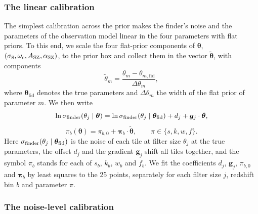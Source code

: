 \subsubsection{The linear calibration}\label{sec:calib-linear}

The simplest calibration across the prior makes the finder's noise and the parameters of the observation
model linear in the four parameters with flat priors. To this end, we scale the four flat-prior
components of $\bm\theta$, $(\sigma_8, \omega_\mathrm{c}, A_\mathrm{SZ}, \alpha_\mathrm{SZ})$, to the prior box and collect them in the vector
$\tilde{\bm{\theta}}$, with components
\begin{equation}
\tilde\theta_m = \frac{\theta_m - \theta_{m,\mathrm{fid}}}{\Delta\theta_m},
\label{eq:calib-x}
\end{equation}
where $\bm{\theta}_\mathrm{fid}$ denotes the true parameters and $\Delta\theta_m$ the width of the flat prior of
parameter $m$. We then write
\begin{equation}
\ln\sigma_\mathrm{finder}(\theta_j \mid \bm{\theta}) = \ln\sigma_\mathrm{finder}(\theta_j \mid \bm{\theta}_\mathrm{fid}) + d_j + \bm{g}_j\cdot\tilde{\bm{\theta}},
\label{eq:calib-theta-sigma}
\end{equation}
\begin{equation}
\pi_b(\bm{\theta}) = \pi_{b,0} + \bm{\pi}_b\cdot\tilde{\bm{\theta}},\qquad \pi \in \{s, k, w, f\}.
\label{eq:calib-theta-c}
\end{equation}
Here $\sigma_\mathrm{finder}(\theta_j \mid \bm{\theta}_\mathrm{fid})$ is the noise of each tile at filter size $\theta_j$ at
the true parameters, the offset $d_j$ and the gradient $\bm{g}_j$ shift all tiles together, and the symbol
$\pi_b$ stands for each of $s_b$, $k_b$, $w_b$ and $f_b$. We fit the coefficients $d_j$, $\bm{g}_j$,
$\pi_{b,0}$ and $\bm{\pi}_b$ by least squares to the 25 points, separately for each filter size $j$, redshift
bin $b$ and parameter $\pi$.

\subsubsection{The noise-level calibration}\label{sec:calib-noise}

